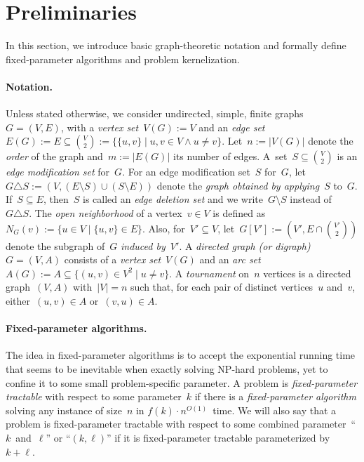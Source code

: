 \documentclass[envcountsame,numbook,smallextended]{svjour3}
\numberwithin{equation}{section}
\numberwithin{figure}{section}
\newcommand{\symdiff}{\triangle}
\begin{document}
\section{Preliminaries}\label{sec:prelim}
In this section, we introduce basic graph-theoretic notation and formally define fixed-parameter algorithms and problem kernelization.
\paragraph{Notation.}
\label{sec:notation}
Unless stated otherwise, we consider undirected, simple, finite graphs~$G=(V,E)$, with a \emph{vertex set}~$V(G):=V$ and an \emph{edge set}~$E(G):=E\subseteq \binom{V}{2}:=\{\{u,v\}\mid u,v\in V \wedge u\neq v\}$.  Let~$n:=|V(G)|$ denote the \emph{order} of the graph and~$m:=|E(G)|$ its number of edges.  A~set~$S\subseteq \binom{V}{2}$ is an \emph{edge modification set} for~$G$. For an edge modification set~$S$ for~$G$, let~$G\symdiff{} S:=(V,(E\setminus S)\cup (S\setminus E))$ denote the \emph{graph obtained by applying}~$S$ to~$G$.  If~$S\subseteq E$, then~$S$ is called an \emph{edge deletion set} and we write~$G\setminus S$ instead of~$G\symdiff{} S$.  
The \emph{open neighborhood} of a vertex~$v\in V$ is defined as~$N_G(v):=\{u\in V\mid \{u,v\}\in E\}$. Also, for~$V'\subseteq V$, let~$G[V']:=(V',E\cap\binom{V'}{2})$ denote the subgraph of~$G$ \emph{induced by~$V'$}.
A \emph{directed graph (or digraph)}~$G=(V,A)$ consists of a \emph{vertex set}~$V(G)$ and an \emph{arc set}~$A(G):=A\subseteq\{(u,v)\in V^2\mid u\neq v\}$.  A \emph{tournament} on~$n$ vertices is a directed graph~$(V,A)$ with~$|V|=n$ such that, for each pair of distinct vertices~$u$ and~$v$, either~$(u,v)\in A$ or~$(v,u)\in A$.




\paragraph{Fixed-parameter algorithms.} The idea in fixed-parameter algorithms is to accept the exponential running time that seems to be inevitable when exactly solving NP-hard problems, yet to confine it to some small problem-specific parameter.  A problem is \emph{fixed-parameter tractable} with respect to some parameter~\(k\) if there is a \emph{fixed-parameter algorithm} solving any instance of size~\(n\) in $f(k)\cdot n^{O(1)}$~time.  We will also say that a problem is fixed-parameter tractable with respect to some combined parameter~``\(k\)~and~\(\ell\)'' or ``\((k,\ell)\)'' if it is fixed-parameter tractable parameterized by \(k+\ell\).
\end{document}
